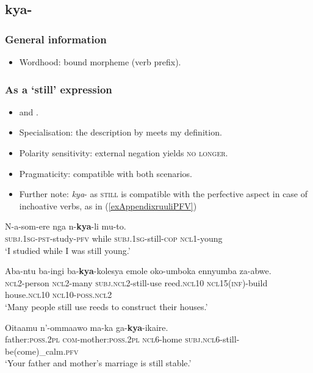 \subsection{kya-}
\subsubsection{General information}
\begin{itemize}
	\item Wordhood: bound morpheme (verb prefix).
\end{itemize}


\subsubsection{As a  \lq still\rq{ }expression}
\begin{itemize}
 	\item \textcite{MolochievaEtAl2021} and \textcite[63–66]{NamyaloEtAl2021}.
	\item Specialisation: the description by \citeauthor{MolochievaEtAl2021} meets my definition.
	\item Polarity sensitivity: external negation yields \textsc{no longer}.
	\item Pragmaticity: compatible with both scenarios.
	\item Further note: \mbox{\textit{kya}-} as \textsc{still} is compatible with the perfective aspect in case of inchoative verbs, as in (\ref{exAppendixruuliPFV})
\end{itemize}
\largerpage
\begin{exe}
	\ex
	\gll N-a-som-ere nga n-\textbf{kya}-li mu-to.\\
	\textsc{subj}.1\textsc{sg}-\textsc{pst}-study-\textsc{pfv} while \textsc{subj}.1\textsc{sg}-still-\textsc{cop} \textsc{ncl}1-young\\
	\glt \lq I studied while I was still young.' \parencite[75]{MolochievaEtAl2021}

	\ex
	\gll Aba-ntu ba-ingi ba-\textbf{kya}-kolesya emole oko-umboka ennyumba za-abwe.\\
	\textsc{ncl}2-person \textsc{ncl}2-many \textsc{subj}.\textsc{ncl}2-still-use reed.\textsc{ncl10} \textsc{ncl}15(\textsc{inf})-build house.\textsc{ncl}10 \textsc{ncl}10-\textsc{poss}.\textsc{ncl}2\\
	\glt \lq Many people still use reeds to construct their houses.\rq{ }\parencite[75]{MolochievaEtAl2021}

	\ex\label{exAppendixruuliPFV}
	\gll Oitaamu n'-ommaawo ma-ka ga-\textbf{kya}-ikaire.\\
	father:\textsc{poss}.2\textsc{pl} \textsc{com}-mother:\textsc{poss}.2\textsc{pl} \textsc{ncl}6-home \textsc{subj}.\textsc{ncl}6-still-be(come)\_calm.\textsc{pfv}\\
	\glt \lq Your father and mother's marriage is still stable.\rq{ }\parencite{RuuliCorpus}
\end{exe}

